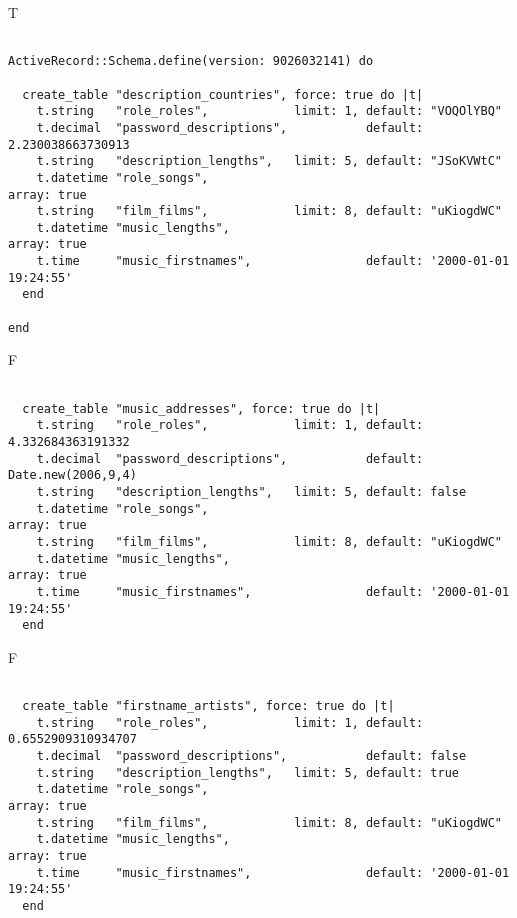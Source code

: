 T
\begin{verbatim}

ActiveRecord::Schema.define(version: 9026032141) do

  create_table "description_countries", force: true do |t|
    t.string   "role_roles",            limit: 1, default: "VOQOlYBQ"
    t.decimal  "password_descriptions",           default: 2.230038663730913
    t.string   "description_lengths",   limit: 5, default: "JSoKVWtC"
    t.datetime "role_songs",                                                      array: true
    t.string   "film_films",            limit: 8, default: "uKiogdWC"
    t.datetime "music_lengths",                                                   array: true
    t.time     "music_firstnames",                default: '2000-01-01 19:24:55'
  end

end
\end{verbatim}


F
\begin{verbatim}

  create_table "music_addresses", force: true do |t|
    t.string   "role_roles",            limit: 1, default: 4.332684363191332
    t.decimal  "password_descriptions",           default: Date.new(2006,9,4)
    t.string   "description_lengths",   limit: 5, default: false
    t.datetime "role_songs",                                                      array: true
    t.string   "film_films",            limit: 8, default: "uKiogdWC"
    t.datetime "music_lengths",                                                   array: true
    t.time     "music_firstnames",                default: '2000-01-01 19:24:55'
  end

\end{verbatim}

F
\begin{verbatim}

  create_table "firstname_artists", force: true do |t|
    t.string   "role_roles",            limit: 1, default: 0.6552909310934707
    t.decimal  "password_descriptions",           default: false
    t.string   "description_lengths",   limit: 5, default: true
    t.datetime "role_songs",                                                      array: true
    t.string   "film_films",            limit: 8, default: "uKiogdWC"
    t.datetime "music_lengths",                                                   array: true
    t.time     "music_firstnames",                default: '2000-01-01 19:24:55'
  end

\end{verbatim}

